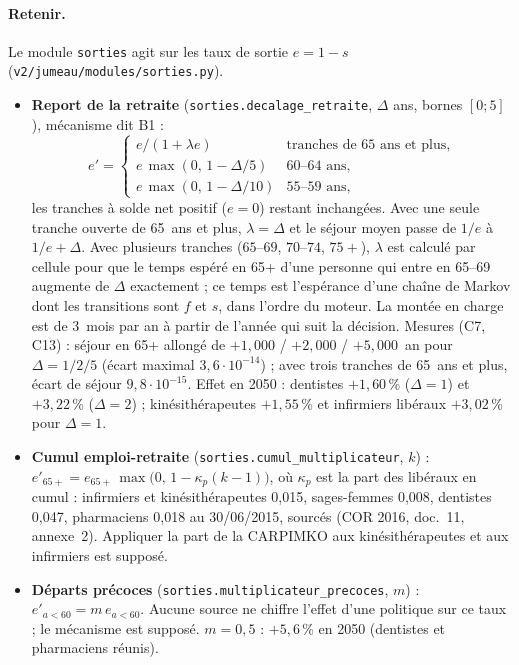 \paragraph{Retenir.} Le module \texttt{sorties} agit sur les taux de sortie $e = 1 - s$
(\texttt{v2/jumeau/modules/sorties.py}).
\begin{itemize}
  \item \textbf{Report de la retraite} (\texttt{sorties.decalage\_retraite}, $\Delta$ ans, bornes $[0 ; 5]$),
        mécanisme dit B1 :
        \begin{equation}\label{jum:eq:retraite}
          e' =
          \begin{cases}
            e / (1 + \lambda e) & \text{tranches de 65~ans et plus,} \\
            e\, \max(0,\, 1 - \Delta/5) & \text{60--64~ans,} \\
            e\, \max(0,\, 1 - \Delta/10) & \text{55--59~ans,}
          \end{cases}
        \end{equation}
        les tranches à solde net positif ($e = 0$) restant inchangées. Avec une seule tranche ouverte de
        65~ans et plus, $\lambda = \Delta$ et le séjour moyen passe de $1/e$ à $1/e + \Delta$. Avec plusieurs
        tranches ($65$--$69$, $70$--$74$, $75+$), $\lambda$ est calculé par cellule pour que le temps espéré en
        65+ d'une personne qui entre en 65--69 augmente de $\Delta$ exactement ; ce temps est l'espérance d'une
        chaîne de Markov dont les transitions sont $f$ et $s$, dans l'ordre du moteur. La montée en charge est
        de 3\suppose{}~mois par an à partir de l'année qui suit la décision. Mesures (C7, C13) : séjour en 65+
        allongé de $+1{,}000$ / $+2{,}000$ / $+5{,}000$\mesure{}~an pour $\Delta = 1 / 2 / 5$ (écart maximal
        $3{,}6\cdot10^{-14}$\mesure{}) ; avec trois tranches de 65~ans et plus, écart de séjour
        $9{,}8\cdot10^{-15}$\mesure{}. Effet en 2050 : dentistes $+1{,}60$\mesure{}\,\% ($\Delta = 1$) et
        $+3{,}22$\mesure{}\,\% ($\Delta = 2$) ; kinésithérapeutes $+1{,}55$\mesure{}\,\% et infirmiers libéraux
        $+3{,}02$\mesure{}\,\% pour $\Delta = 1$.
  \item \textbf{Cumul emploi-retraite} (\texttt{sorties.cumul\_multiplicateur}, $k$) :
        $e'_{65+} = e_{65+}\, \max\bigl(0,\, 1 - \kappa_p (k - 1)\bigr)$, où $\kappa_p$ est la part des libéraux en
        cumul : infirmiers et kinésithérapeutes 0,015, sages-femmes 0,008, dentistes 0,047, pharmaciens
        0,018 au 30/06/2015, sourcés (COR 2016, doc.~11, annexe~2). Appliquer la part de la CARPIMKO aux
        kinésithérapeutes et aux infirmiers est supposé\suppose{}.
  \item \textbf{Départs précoces} (\texttt{sorties.multiplicateur\_precoces}, $m$) : $e'_{a < 60} = m\, e_{a<60}$.
        Aucune source ne chiffre l'effet d'une politique sur ce taux ; le mécanisme est supposé\suppose{}.
        $m = 0{,}5$ : $+5{,}6$\mesure{}\,\% en 2050 (dentistes et pharmaciens réunis).
\end{itemize}

